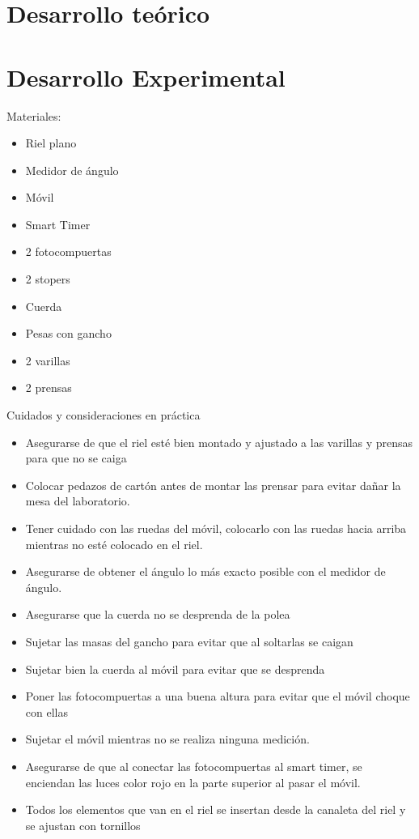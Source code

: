\documentclass{article}
\begin{document}

\begin{multicols}{2}

\section{Desarrollo teórico}\label{Desarrollo Teorico}                              	%

\section{Desarrollo Experimental}\label{Desarrollo experimental}				%
Materiales:
\begin{itemize}[label=$-$]
	\item Riel plano
	\item Medidor de ángulo 
	\item Móvil
	\item Smart Timer
	\item 2 fotocompuertas
	\item 2 stopers
	\item Cuerda
	\item Pesas con gancho
	\item 2 varillas
	\item 2 prensas
\end{itemize}

Cuidados y consideraciones en práctica
\begin{itemize}[label=$bullet$]
	\item Asegurarse de que el riel esté bien montado y ajustado a las varillas y prensas para
que no se caiga
	\item Colocar pedazos de cartón antes de montar las prensar para evitar dañar la mesa
del laboratorio.
 \item Tener cuidado con las ruedas del móvil, colocarlo con las ruedas hacia arriba
mientras no esté colocado en el riel.
 \item Asegurarse de obtener el ángulo lo más exacto posible con el medidor de ángulo.
 \item Asegurarse que la cuerda no se desprenda de la polea
 \item Sujetar las masas del gancho para evitar que al soltarlas se caigan
 \item Sujetar bien la cuerda al móvil para evitar que se desprenda
 \item Poner las fotocompuertas a una buena altura para evitar que el móvil choque con
ellas
 \item Sujetar el móvil mientras no se realiza ninguna medición.
	\item Asegurarse de que al conectar las fotocompuertas al smart timer, se enciendan las
luces color rojo en la parte superior al pasar el móvil.
\item Todos los elementos que van en el riel se insertan desde la canaleta del riel y se
ajustan con tornillos
\end{itemize}

\end{multicols}
\end{document}

